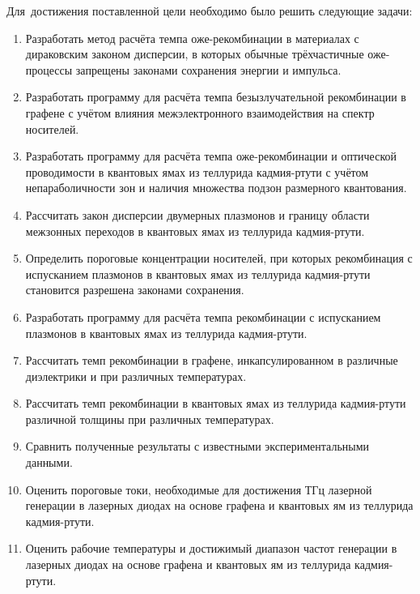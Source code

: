 Для~достижения поставленной цели необходимо было решить следующие задачи:
\begin{enumerate}
  \item Разработать метод расчёта темпа оже-рекомбинации в материалах с дираковским законом дисперсии, в которых обычные трёхчастичные оже-процессы запрещены законами сохранения энергии и импульса.
  \item Разработать программу для расчёта темпа безызлучательной рекомбинации в графене с учётом влияния межэлектронного взаимодействия на спектр носителей.
  \item Разработать программу для расчёта темпа оже-рекомбинации и оптической проводимости в квантовых ямах из теллурида кадмия-ртути с учётом непараболичности зон и наличия множества подзон размерного квантования.
  \item Рассчитать закон дисперсии двумерных плазмонов и границу области межзонных переходов в квантовых ямах из теллурида кадмия-ртути.
  \item Определить пороговые концентрации носителей, при которых рекомбинация с испусканием плазмонов в квантовых ямах из теллурида кадмия-ртути становится разрешена законами сохранения.
  \item Разработать программу для расчёта темпа рекомбинации с испусканием плазмонов в квантовых ямах из теллурида кадмия-ртути.
  \item Рассчитать темп рекомбинации в графене, инкапсулированном в различные диэлектрики и при различных температурах.
  \item Рассчитать темп рекомбинации в квантовых ямах из теллурида кадмия-ртути различной толщины при различных температурах.
  \item Сравнить полученные результаты с известными экспериментальными данными.
  \item Оценить пороговые токи, необходимые для достижения ТГц лазерной генерации в лазерных диодах на основе графена и квантовых ям из теллурида кадмия-ртути.
  \item Оценить рабочие температуры и достижимый диапазон частот генерации в лазерных диодах на основе графена и квантовых ям из теллурида кадмия-ртути.
\end{enumerate}

